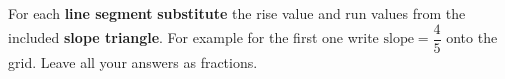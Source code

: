 \documentclass[12pt, a4paper, addpoints]{exam}
\begin{document}
\begin{questions}



\newcommand{\smallspace}{\vspace{1mm}}


\question For each \textbf{line segment}  \textbf{substitute}   the rise value and run values from the included \textbf{slope triangle}. For example for the first one write $\text{slope}=\dfrac{4}{5}$ onto the grid. Leave all  your answers as  fractions.
\begin{multicols}{3}
\end{multicols}




\end{questions}
\end{document}
